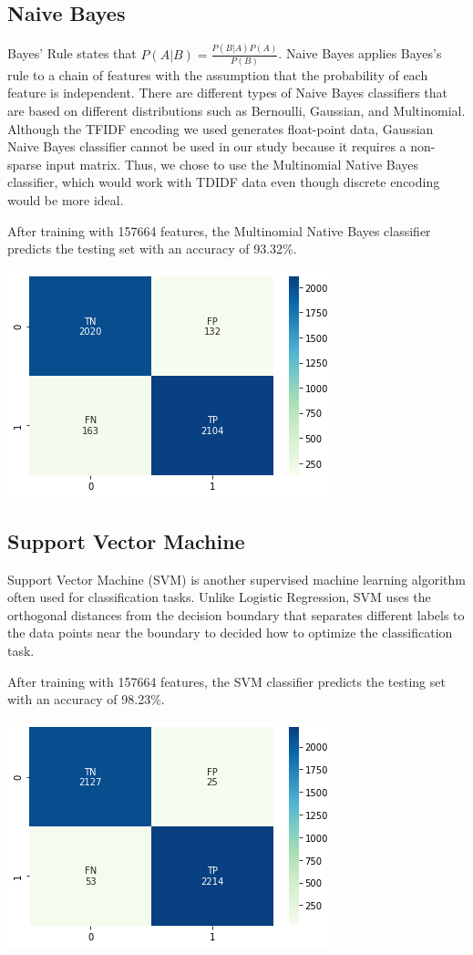 \documentclass{article}
\begin{document}
\begin{multicols}{2}
\subsection{Naive Bayes}
Bayes' Rule states that $P(A|B)=\frac{P(B|A)P(A)}{P(B)}$. Naive Bayes applies Bayes's rule to a chain of features with the assumption that the probability of each feature is independent. There are different types of Naive Bayes classifiers that are based on different distributions such as Bernoulli, Gaussian, and Multinomial. Although the TFIDF encoding we used generates float-point data, Gaussian Naive Bayes classifier cannot be used in our study because it requires a non-sparse input matrix. Thus, we chose to use the Multinomial Native Bayes classifier, which would work with TDIDF data even though discrete encoding would be more ideal. 

After training with 157664 features, the Multinomial Native Bayes classifier predicts the testing set with an accuracy of 93.32\%.

\includegraphics[scale=0.6]{images/nbcm.png}


\subsection{Support Vector Machine}
Support Vector Machine (SVM) is another supervised machine learning algorithm often used for classification tasks. Unlike Logistic Regression, SVM uses the orthogonal distances from the decision boundary that separates different labels to the data points near the boundary to decided how to optimize the classification task. 

After training with 157664 features, the SVM classifier predicts the testing set with an accuracy of 98.23\%.

\includegraphics[scale=0.6]{images/svmcm.png}


\end{multicols}
\end{document}
